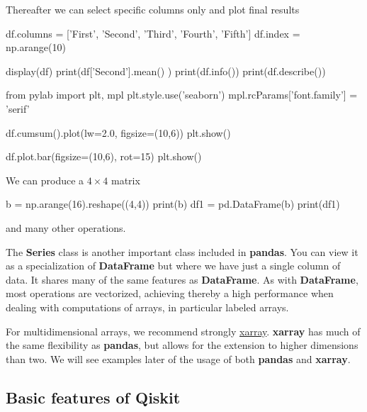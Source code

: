\documentclass[%
oneside,                 %
final,                   %
10pt]{article}
\begin{document}
\epycod


Thereafter we can select specific columns only and plot final results



















\bpycod
df.columns = ['First', 'Second', 'Third', 'Fourth', 'Fifth']
df.index = np.arange(10)

display(df)
print(df['Second'].mean() )
print(df.info())
print(df.describe())

from pylab import plt, mpl
plt.style.use('seaborn')
mpl.rcParams['font.family'] = 'serif'

df.cumsum().plot(lw=2.0, figsize=(10,6))
plt.show()


df.plot.bar(figsize=(10,6), rot=15)
plt.show()

\epycod

We can produce a $4\times 4$ matrix





\bpycod
b = np.arange(16).reshape((4,4))
print(b)
df1 = pd.DataFrame(b)
print(df1)

\epycod

and many other operations. 

The \textbf{Series} class is another important class included in
\textbf{pandas}. You can view it as a specialization of \textbf{DataFrame} but where
we have just a single column of data. It shares many of the same features as \textbf{DataFrame}. As with \textbf{DataFrame},
most operations are vectorized, achieving thereby a high performance when dealing with computations of arrays, in particular labeled arrays.

For multidimensional arrays, we recommend strongly \href{{http://xarray.pydata.org/en/stable/}}{xarray}. \textbf{xarray} has much of the same flexibility as \textbf{pandas}, but allows for the extension to higher dimensions than two. We will see examples later of the usage of both \textbf{pandas} and \textbf{xarray}. 

\subsection{Basic features of Qiskit}
\end{document}
